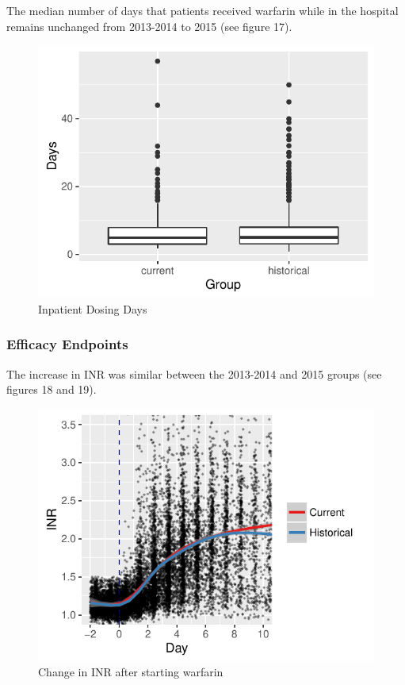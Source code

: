 \documentclass[]{article}
\begin{document}
The median number of days that patients received warfarin while in the
hospital remains unchanged from 2013-2014 to 2015 (see figure 17).

\begin{figure}[H]
\centering
\includegraphics{warfarin_analysis_2015_files/figure-latex/dosing_days_hist-1.pdf}
\caption{Inpatient Dosing Days}
\end{figure}

\subsubsection{Efficacy Endpoints}\label{efficacy-endpoints-1}

The increase in INR was similar between the 2013-2014 and 2015 groups
(see figures 18 and 19).

\begin{figure}[H]
\centering
\includegraphics{warfarin_analysis_2015_files/figure-latex/inr_hist-1.pdf}
\caption{Change in INR after starting warfarin}
\end{figure}
\end{document}
